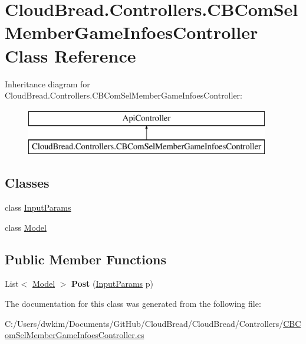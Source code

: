 \hypertarget{class_cloud_bread_1_1_controllers_1_1_c_b_com_sel_member_game_infoes_controller}{}\section{Cloud\+Bread.\+Controllers.\+C\+B\+Com\+Sel\+Member\+Game\+Infoes\+Controller Class Reference}
\label{class_cloud_bread_1_1_controllers_1_1_c_b_com_sel_member_game_infoes_controller}
Inheritance diagram for Cloud\+Bread.\+Controllers.\+C\+B\+Com\+Sel\+Member\+Game\+Infoes\+Controller\+:\begin{figure}[H]
\begin{center}
\leavevmode
\includegraphics[height=2.000000cm]{class_cloud_bread_1_1_controllers_1_1_c_b_com_sel_member_game_infoes_controller}
\end{center}
\end{figure}
\subsection*{Classes}
\begin{DoxyCompactItemize}
\item 
class \hyperlink{class_cloud_bread_1_1_controllers_1_1_c_b_com_sel_member_game_infoes_controller_1_1_input_params}{Input\+Params}
\item 
class \hyperlink{class_cloud_bread_1_1_controllers_1_1_c_b_com_sel_member_game_infoes_controller_1_1_model}{Model}
\end{DoxyCompactItemize}
\subsection*{Public Member Functions}
\begin{DoxyCompactItemize}
\item 
List$<$ \hyperlink{class_cloud_bread_1_1_controllers_1_1_c_b_com_sel_member_game_infoes_controller_1_1_model}{Model} $>$ {\bfseries Post} (\hyperlink{class_cloud_bread_1_1_controllers_1_1_c_b_com_sel_member_game_infoes_controller_1_1_input_params}{Input\+Params} p)\hypertarget{class_cloud_bread_1_1_controllers_1_1_c_b_com_sel_member_game_infoes_controller_ad80cdce46a97b2eaf66b8df6572d0a70}{}\label{class_cloud_bread_1_1_controllers_1_1_c_b_com_sel_member_game_infoes_controller_ad80cdce46a97b2eaf66b8df6572d0a70}

\end{DoxyCompactItemize}


The documentation for this class was generated from the following file\+:\begin{DoxyCompactItemize}
\item 
C\+:/\+Users/dwkim/\+Documents/\+Git\+Hub/\+Cloud\+Bread/\+Cloud\+Bread/\+Controllers/\hyperlink{_c_b_com_sel_member_game_infoes_controller_8cs}{C\+B\+Com\+Sel\+Member\+Game\+Infoes\+Controller.\+cs}\end{DoxyCompactItemize}
